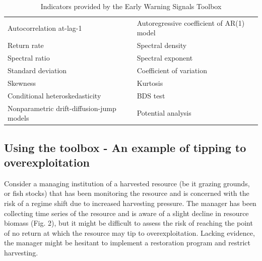 \documentclass[12pt,a4paper,final]{article}
\begin{document}
\begin{doublespacing}
\begin{table}[h]
\centering
\caption{Indicators provided by the Early Warning Signals Toolbox}%
\begin{tabular}{l l}%
\hline
\hline
Autocorrelation at-lag-1 &	%
Autoregressive coefficient of AR(1) model	\\ %
Return rate &	%
Spectral density \\%
Spectral ratio &	%
Spectral exponent\\	%
Standard deviation &	%
Coefficient of variation\\	%
Skewness &	%
Kurtosis	\\%
Conditional heteroskedasticity	&%
BDS test	\\%
Nonparametric drift-diffusion-jump models	&%
Potential analysis	\\ [0.5ex]%
\hline
\hline
\end{tabular}
\label{methods_table}
\end{table}%

\subsection{Using the toolbox - An example of tipping to overexploitation}
Consider a managing institution of a harvested resource (be it grazing grounds, or fish stocks) that has been monitoring the resource and is concerned with the risk of a regime shift due to increased harvesting pressure. The manager has been collecting time series of the resource and is aware of a slight decline in resource biomass (Fig. 2), but it might be difficult to assess the risk of reaching the point of no return at which the resource may tip to overexploitation. Lacking evidence, the manager might be hesitant to implement a restoration program and restrict harvesting. 


\end{doublespacing}
\end{document}
